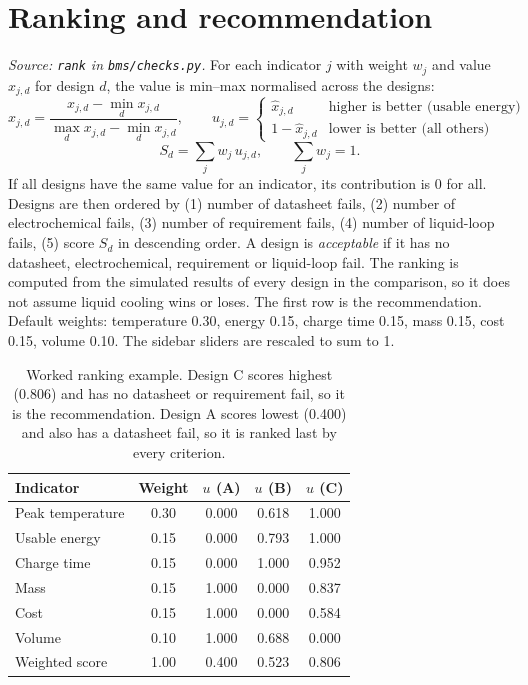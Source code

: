 \documentclass[11pt,a4paper]{article}
\begin{document}
\section{Ranking and recommendation}\label{sec:rank}
\emph{Source: \texttt{rank} in \texttt{bms/checks.py}.} For each indicator $j$ with weight $w_j$ and value $x_{j,d}$ for design $d$, the value is min--max normalised across the designs:
\begin{equation}
\hat x_{j,d}=\frac{x_{j,d}-\min_d x_{j,d}}{\max_d x_{j,d}-\min_d x_{j,d}},\qquad
u_{j,d}=\begin{cases}\hat x_{j,d}&\text{higher is better (usable energy)}\\1-\hat x_{j,d}&\text{lower is better (all others)}\end{cases}
\end{equation}
\begin{equation}
S_d=\sum_j w_j\,u_{j,d},\qquad \sum_j w_j=1 .
\end{equation}
If all designs have the same value for an indicator, its contribution is 0 for all. Designs are then ordered by (1) number of datasheet fails, (2) number of electrochemical fails, (3) number of requirement fails, (4) number of liquid-loop fails, (5) score $S_d$ in descending order. A design is \emph{acceptable} if it has no datasheet, electrochemical, requirement or liquid-loop fail. The ranking is computed from the simulated results of every design in the comparison, so it does not assume liquid cooling wins or loses. The first row is the recommendation. Default weights: temperature 0.30, energy 0.15, charge time 0.15, mass 0.15, cost 0.15, volume 0.10. The sidebar sliders are rescaled to sum to 1.

\begin{table}[H]
\centering
\begin{tabular}{@{}lcccc@{}}
\toprule
Indicator & Weight & $u$ (A) & $u$ (B) & $u$ (C) \\
\midrule
Peak temperature & 0.30 & 0.000 & 0.618 & 1.000 \\
Usable energy & 0.15 & 0.000 & 0.793 & 1.000 \\
Charge time & 0.15 & 0.000 & 1.000 & 0.952 \\
Mass & 0.15 & 1.000 & 0.000 & 0.837 \\
Cost & 0.15 & 1.000 & 0.000 & 0.584 \\
Volume & 0.10 & 1.000 & 0.688 & 0.000 \\
\midrule
Weighted score & 1.00 & 0.400 & 0.523 & 0.806 \\
\bottomrule
\end{tabular}
\caption{Worked ranking example. Design C scores highest (0.806) and has no datasheet or requirement fail, so it is the recommendation. Design A scores lowest (0.400) and also has a datasheet fail, so it is ranked last by every criterion.}
\end{table}
\end{document}
